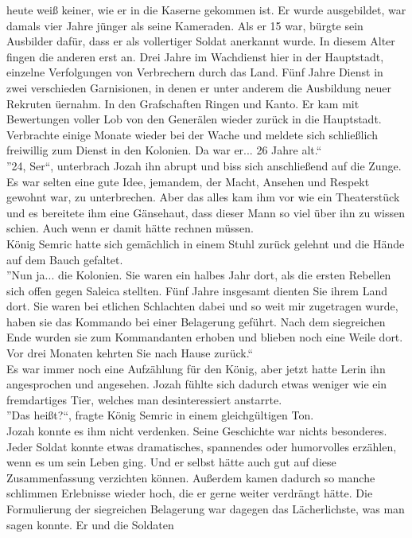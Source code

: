 heute weiß keiner, wie er in die Kaserne gekommen ist. Er wurde ausgebildet, war damals vier Jahre 
jünger als seine Kameraden. Als er 15 war, bürgte sein Ausbilder dafür, dass er als vollertiger 
Soldat anerkannt wurde. In diesem Alter fingen die anderen erst an. Drei Jahre im Wachdienst hier in 
der Hauptstadt, einzelne Verfolgungen von Verbrechern durch das Land. Fünf Jahre Dienst in zwei 
verschieden Garnisionen, in denen er unter anderem die Ausbildung neuer Rekruten üernahm. In den 
Grafschaften Ringen und Kanto. Er kam mit Bewertungen voller Lob von den Generälen wieder zurück in 
die Hauptstadt. Verbrachte einige Monate wieder bei der Wache und meldete sich schließlich 
freiwillig zum Dienst in den Kolonien. Da war er... 26 Jahre alt.``\\
''24, Ser``, unterbrach Jozah ihn abrupt und biss sich anschließend auf die Zunge. Es war selten 
eine gute Idee, jemandem, der Macht, Ansehen und Respekt gewohnt war, zu unterbrechen. Aber das 
alles kam ihm vor wie ein Theaterstück und es bereitete ihm eine Gänsehaut, dass dieser Mann so 
viel über ihn zu wissen schien. Auch wenn er damit hätte rechnen müssen.\\
König Semric hatte sich gemächlich in einem Stuhl zurück gelehnt und die Hände auf dem Bauch 
gefaltet.\\
''Nun ja... die Kolonien. Sie waren ein halbes Jahr dort, als die ersten Rebellen sich offen 
gegen Saleica stellten. Fünf Jahre insgesamt dienten Sie ihrem Land dort. Sie waren bei etlichen 
Schlachten dabei und so weit mir zugetragen wurde, haben sie das Kommando bei einer Belagerung 
geführt. Nach dem siegreichen Ende wurden sie zum Kommandanten erhoben und blieben noch eine Weile 
dort. Vor drei Monaten kehrten Sie nach Hause zurück.``\\
Es war immer noch eine Aufzählung für den König, aber jetzt hatte Lerin ihn angesprochen und 
angesehen. Jozah fühlte sich dadurch etwas weniger wie ein fremdartiges Tier, welches man 
desinteressiert anstarrte. \\
''Das heißt?``, fragte König Semric in einem gleichgültigen Ton. \\
Jozah konnte es ihm nicht verdenken. Seine Geschichte war nichts besonderes. Jeder Soldat konnte 
etwas dramatisches, spannendes oder humorvolles erzählen, wenn es um sein Leben ging. Und er selbst 
hätte auch gut auf diese Zusammenfassung verzichten können. Außerdem kamen dadurch so manche 
schlimmen Erlebnisse wieder hoch, die er gerne weiter verdrängt hätte. Die Formulierung der 
siegreichen Belagerung war dagegen das Lächerlichste, was man sagen konnte. Er und die Soldaten 
